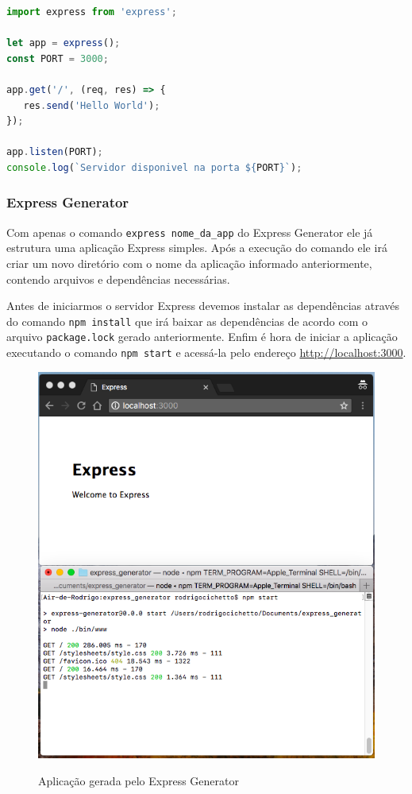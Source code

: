 \documentclass[
	12pt,				%
	openright,			%
	twoside,			%
	a4paper,			%
	english,			%
	brazil				%
	]{abntex2}
\begin{document}
\begin{lstlisting}[language=javascript]
import express from 'express';

let app = express();
const PORT = 3000;

app.get('/', (req, res) => {
   res.send('Hello World');
});

app.listen(PORT);
console.log(`Servidor disponivel na porta ${PORT}`);
\end{lstlisting}

\subsubsection{Express Generator}

Com apenas o comando \verb|express nome_da_app| do Express Generator ele já estrutura uma aplicação Express simples. Após a execução do comando ele irá criar um novo diretório com o nome da aplicação informado anteriormente, contendo arquivos e dependências necessárias. 

Antes de iniciarmos o servidor Express devemos instalar as dependências através do comando \verb|npm install| que irá baixar as dependências de acordo com o arquivo \verb|package.lock| gerado anteriormente. Enfim é hora de iniciar a aplicação executando o comando \verb|npm start| e acessá-la pelo endereço \href{http://localhost:3000}{http://localhost:3000}.

\begin{figure}[h]
	\centering

	\caption{Aplicação gerada pelo Express Generator} \label{fig:ExpressGeneratorApp}
    \includegraphics[scale=0.5]{express-generator-app} \\

\end{figure}
\end{document}

